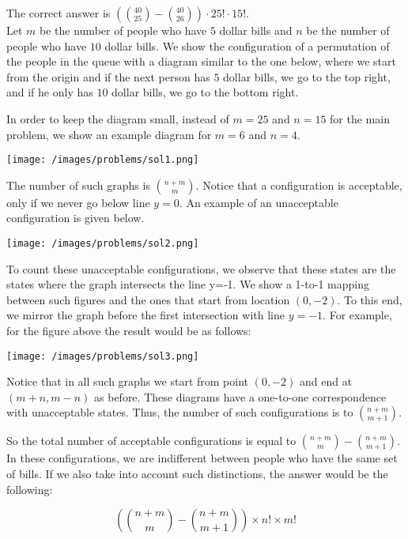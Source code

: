 \begin{solution}
The correct answer is $
(\binom{40 }{25} - \binom{40}{26}) \cdot 25! \cdot 15!$.\\[0.2cm]

Let $m$ be the number of people who have $5$ dollar bills and $n$ be the number of people who have $10$ dollar bills.
We show the configuration of a permutation of the people in the queue with a diagram similar to the one below, where we start from the origin and if the next person has $5$ dollar bills, we go to the top right, and if he only has $10$ dollar bills, we go to the bottom right.

In order to keep the diagram small, instead of $m=25$ and $n=15$ for the main problem,  we show an example diagram for  $m=6$ and $n=4$. 

\begin{center}
	\texttt{[image: /images/problems/sol1.png]}
\end{center}

The number of such graphs is ${n+m \choose m}$. Notice that a configuration is acceptable, only if we never go below line $y=0$. An example of an unacceptable configuration is given below.

\begin{center}
	\texttt{[image: /images/problems/sol2.png]}
\end{center}

To count these unacceptable configurations, we observe that these states are the states where the graph intersects the line y=-1. We show a 1-to-1 mapping between such figures and the ones that start from location $(0,-2)$. To this end, we mirror the graph before the first intersection with line $y=-1$. For example, for the figure above the result would be as follows:

\begin{center}
	\texttt{[image: /images/problems/sol3.png]}
\end{center}

Notice that in all such graphs we start from point $(0,-2)$ and end at $(m+n, m-n)$ as before. These diagrams have a one-to-one correspondence with unacceptable states. Thus, the number of such configurations is to ${n+m \choose m+1}$.

So the total number of acceptable configurations is equal to ${n+m \choose m} - {n+m \choose m+1}$. In these configurations, we are indifferent between people who have the same set of bills.
If we also take into account such distinctions, the answer would be the following:

$$
({n+m \choose m} - {n+m \choose m+1}) \times n! \times m!
$$




\end{solution}